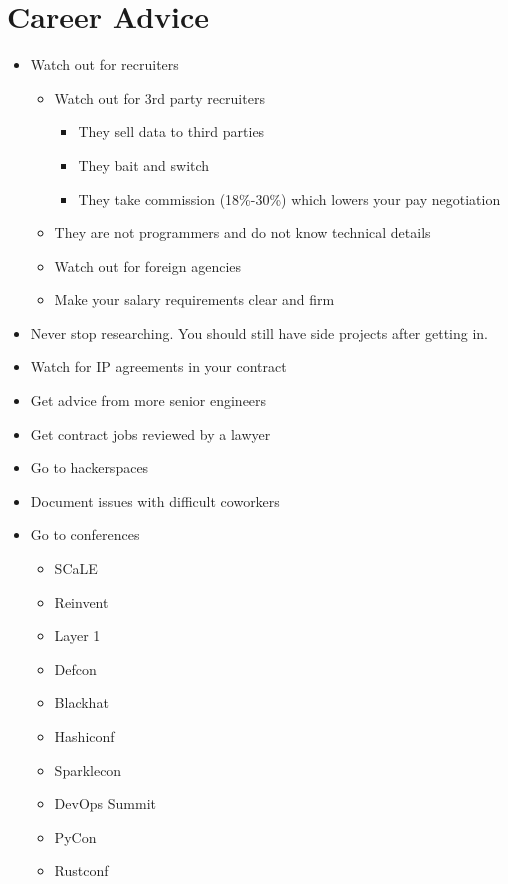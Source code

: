 \documentclass[12pt]{article}
\begin{document}
\section{Career Advice}
\begin{itemize}
\item Watch out for recruiters
  \begin{itemize}
  \item Watch out for 3rd party recruiters
    \begin{itemize}
    \item They sell data to third parties
    \item They bait and switch
    \item They take commission (18\%-30\%) which lowers your pay
      negotiation
    \end{itemize}
  \item They are not programmers and do not know technical details
  \item Watch out for foreign agencies
  \item Make your salary requirements clear and firm
  \end{itemize}
\item Never stop researching. You should still have side projects
  after getting in.
\item Watch for IP agreements in your contract
\item Get advice from more senior engineers
\item Get contract jobs reviewed by a lawyer
\item Go to hackerspaces
\item Document issues with difficult coworkers
\item Go to conferences
  \begin{itemize}
    \item SCaLE
    \item Reinvent
    \item Layer 1
    \item Defcon
    \item Blackhat
    \item Hashiconf
    \item Sparklecon
    \item DevOps Summit
    \item PyCon
    \item Rustconf
  \end{itemize}
\end{itemize}
\end{document}
